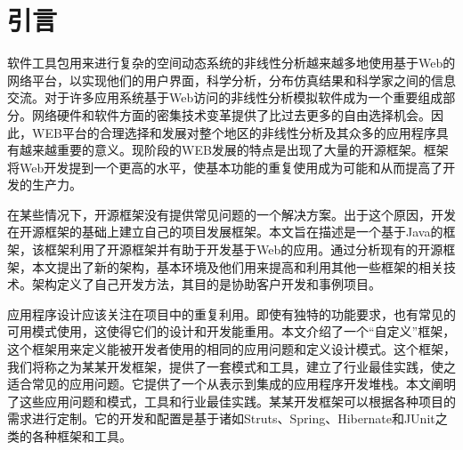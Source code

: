 
\chapter{引言}
软件工具包用来进行复杂的空间动态系统的非线性分析越来越多地使用基于Web的网络平台，以实现他们的用户界面，科学分析，分布仿真结果和科学家之间的信息交流。对于许多应用系统基于Web访问的非线性分析模拟软件成为一个重要组成部分。网络硬件和软件方面的密集技术变革提供了比过去更多的自由选择机会。因此，WEB平台的合理选择和发展对整个地区的非线性分析及其众多的应用程序具有越来越重要的意义。现阶段的WEB发展的特点是出现了大量的开源框架。框架将Web开发提到一个更高的水平，使基本功能的重复使用成为可能和从而提高了开发的生产力。

在某些情况下，开源框架没有提供常见问题的一个解决方案。出于这个原因，开发在开源框架的基础上建立自己的项目发展框架。本文旨在描述是一个基于Java的框架，该框架利用了开源框架并有助于开发基于Web的应用。通过分析现有的开源框架，本文提出了新的架构，基本环境及他们用来提高和利用其他一些框架的相关技术。架构定义了自己开发方法，其目的是协助客户开发和事例项目。

应用程序设计应该关注在项目中的重复利用。即使有独特的功能要求，也有常见的可用模式使用，这使得它们的设计和开发能重用。本文介绍了一个“自定义”框架，这个框架用来定义能被开发者使用的相同的应用问题和定义设计模式。这个框架，我们将称之为某某开发框架，提供了一套模式和工具，建立了行业最佳实践，使之适合常见的应用问题。它提供了一个从表示到集成的应用程序开发堆栈。本文阐明了这些应用问题和模式，工具和行业最佳实践。某某开发框架可以根据各种项目的需求进行定制。它的开发和配置是基于诸如Struts、Spring、Hibernate和JUnit之类的各种框架和工具。
